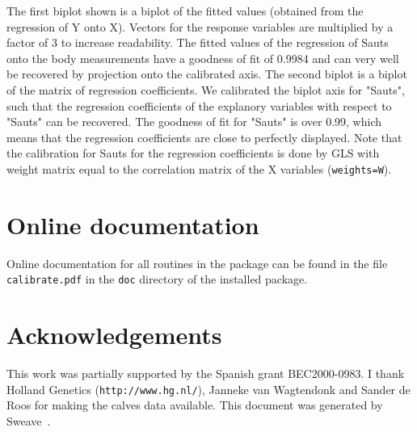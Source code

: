 \documentclass[a4paper]{article}
\begin{document}
The first biplot shown is a biplot of the fitted values (obtained 
from the regression of Y onto X). Vectors for the response variables are multiplied by a factor of 3 to increase
readability. The fitted values of the regression of Sauts onto the body measurements have
a goodness of fit of 0.9984 and can very well be recovered by projection onto the calibrated
axis. The second biplot is a biplot of the matrix of regression coefficients. We
calibrated the biplot axis for "Sauts", such that the regression coefficients of the
explanory variables with respect to "Sauts" can be recovered. The goodness of fit for
"Sauts" is over 0.99, which means that the regression coefficients are close to
perfectly displayed. Note that the calibration for Sauts for the regression coefficients
is done by GLS with weight matrix equal to the correlation matrix of the X variables
({\tt weights=W}).

\section{Online documentation}
\label{sec:online}

Online documentation for all routines in the package can be found in the file
{\tt calibrate.pdf} in the {\tt doc} directory of the installed package.

\section*{Acknowledgements}

This work was partially supported by the Spanish grant BEC2000-0983. I thank Holland Genetics 
({\tt http://www.hg.nl/}), Janneke van Wagtendonk and Sander de Roos for making the calves data 
available. This document was generated by Sweave~\cite{Leisch}.
\end{document}
